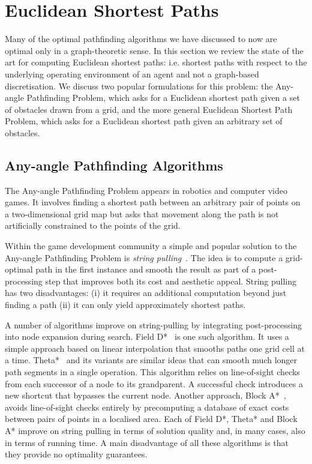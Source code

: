 \section{Euclidean Shortest Paths}
\label{cha::lit::euclidean}
Many of the optimal pathfinding algorithms we have discussed to now are
optimal only in a graph-theoretic sense. In this section we review the state
of the art for computing Euclidean shortest paths: i.e. shortest paths with
respect to the underlying operating environment of an agent and not a
graph-based discretisation. We discuss two popular formulations for this
problem: the Any-angle Pathfinding Problem, which asks for a Euclidean
shortest path given a set of obstacles drawn from a grid, and the more general
Euclidean Shortest Path Problem, which asks for a Euclidean shortest path
given an arbitrary set of obstacles.

\subsection{Any-angle Pathfinding Algorithms}
\label{cha::lit::euclidean:anyangle}
The Any-angle Pathfinding Problem appears in robotics and computer video
games. It involves finding a shortest path between an arbitrary pair of points
on a two-dimensional grid map but asks that movement along the path is not
artificially constrained to the points of the grid.

Within the game development community a simple and popular solution to the
Any-angle Pathfinding Problem is \emph{string
pulling}~\citep{pinter01,botea04}.  The idea is to compute a grid-optimal path
in the first instance and smooth the result as part of a post-processing step
that improves both its cost and aesthetic appeal. String pulling has two
disadvantages: (i) it requires an additional computation beyond just finding a
path (ii) it can only yield approximately shortest paths.

A number of algorithms improve on string-pulling by integrating
post-processing into node expansion during search. Field D{*}~\citep{ferguson05}
is one such algorithm. It uses a simple approach based on linear interpolation
that smooths paths one grid cell at a time.  Theta{*}~\citep{nash07} and its
variants \citep{nash09,nash10,munoz12} are similar ideas that can smooth much
longer path segments in a single operation. This algorithm relies on
line-of-sight checks from each successor of a node to its grandparent. A
successful check introduces a new shortcut that bypasses the current node.
Another approach, Block A{*}~\citep{yap11}, avoids line-of-sight checks entirely
by precomputing a database of exact costs between pairs of points in a
localised area.  Each of Field D{*}, Theta{*} and Block A{*} improve on string
pulling in terms of solution quality and, in many cases, also in terms of
running time.  A main disadvantage of all these algorithms is that they
provide no optimality guarantees.

